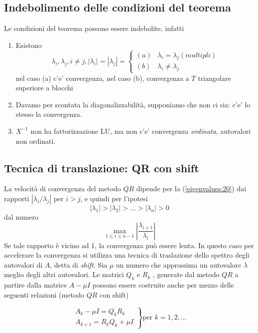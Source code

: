 \subsection{Indebolimento delle condizioni del teorema}
Le condizioni del teorema possono essere indebolite, infatti
\begin{enumerate}
\item Esistono
$$\lambda_i, \lambda_j, i \neq j,
 | \lambda_i| = | \lambda_j | =
\left\{
 \begin{array}{ll}
(a) &  \lambda_i = \lambda_j  (multipli) \\
(b) & \lambda_i \neq \lambda_j
 \end{array}
\right.
$$
nel caso (a) c'e' convergenza,
nel caso (b), convergenza a $T$ triangolare superiore a blocchi

\item
 Davamo per scontata la diagonalizzabilit\`a,
 supponiamo che non ci sia: c'e' lo stesso la convergenza.
\item

 $ X^{-1}$ non ha fattorizzazione LU, ma non c'e' convergenza
 \emph{ordinata}, autovalori non ordinati.
\end{enumerate}
\subsection{Tecnica di translazione: QR con shift}
La velocit\`a di convergenza del metodo $QR$ dipende per la (\ref{eigenvalues:20})
 dai rapporti
$|\lambda_i /\lambda_j |$ per $i > j$, e quindi per l’ipotesi
$$|\lambda_1 | > |\lambda_2 | > . . . > |\lambda_n | > 0$$
 dal numero
\begin{equation}
\label{eigenvalues:23}
 \max_{1 \leq i \leq n-1}
\left|\dfrac{\lambda_{i+1}}{\lambda_i} \right|
\end{equation}
Se tale rapporto \`e vicino ad 1, la convergenza pu\`o essere lenta. In questo
caso per accelerare la convergenza si utilizza una tecnica di traslazione dello
spettro degli autovalori di $A$, detta di \emph{shift}.
Sia $\mu$ un numero che approssima un autovalore $\lambda$ meglio degli altri
autovalori. Le matrici $Q_k$ e $R_k$ , generate dal metodo $QR$ a partire dalla
matrice $A − \mu I$ possono essere costruite anche per mezzo delle seguenti
relazioni (metodo $QR$ con shift)

$$
\left.
\begin{array}{l}
 A_k - \mu I = Q_k R_k \\
A_{k+1} = R_k Q_k + \mu I
\end{array}
\right\}
\text{per } k=1,2, \ldots
$$

